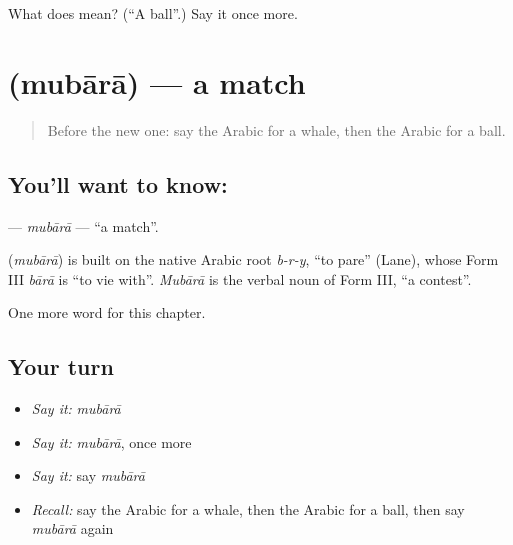 \begin{tcolorbox}[breakable,colback=teal!4,colframe=teal!35!black,title={Before you move on}]
What does  mean? (\textquotedblleft{}A ball\textquotedblright{}.) Say it once more.
\end{tcolorbox}
\section[\texorpdfstring{\ar{مباراة} (mubārā)}{مباراة (mubārā)}]{ (mubārā) — a match}

\label{lesson:AR-C277-mubara}



\begin{quote}
Before the new one: say the Arabic for a whale, then the Arabic for a ball.
\end{quote}

\subsection*{You'll want to know: }
\textbf{} — \emph{mubārā} — \textquotedblleft{}a match\textquotedblright{}.

\begin{cousinweb}
\textbf{} (\emph{mubārā}) is built on the native Arabic root \emph{b-r-y}, \textquotedblleft{}to pare\textquotedblright{} (Lane), whose Form III \emph{bārā} is \textquotedblleft{}to vie with\textquotedblright{}. \emph{Mubārā} is the verbal noun of Form III, \textquotedblleft{}a contest\textquotedblright{}.
\end{cousinweb}

\begin{grammarlens}[title={What you've built}]
One more word for this chapter.
\end{grammarlens}

\subsection*{Your turn}
\begin{itemize}
\raggedright
  \item \emph{Say it:} \emph{mubārā}
  \item \emph{Say it:} \emph{mubārā}, once more
  \item \emph{Say it:} say \emph{mubārā}
  \item \emph{Recall:} say the Arabic for a whale, then the Arabic for a ball, then say \emph{mubārā} again
\end{itemize}

